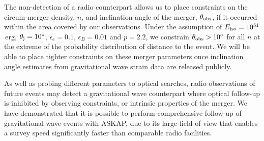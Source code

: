 The non-detection of a radio counterpart allows us to place constraints on the circum-merger density, $n$, and inclination angle of the merger, $\theta_{\rm obs}$, if it occurred within the area covered by our observations. Under the assumption of $E_{\rm iso} = 10^{51}$\,erg, $\theta_{\rm j}=10\mbox{$^\circ$}$, $\epsilon_{e}=0.1$, $\epsilon_{B}=0.01$ and $p=2.2$, we constrain $\theta_{\rm obs} > 10\mbox{$^\circ$}$ for all $n$ at the extreme of the probability distribution of distance to the event. We will be able to place tighter constraints on these merger parameters once inclination angle estimates from gravitational wave strain data are released publicly.

As well as probing different parameters to optical searches, radio observations of future events may detect a gravitational wave counterpart where optical follow-up is inhibited by observing constraints, or intrinsic properties of the merger. We have demonstrated that it is possible to perform comprehensive follow-up of gravitational wave events with ASKAP, due to its large field of view that enables a survey speed significantly faster than comparable radio facilities.